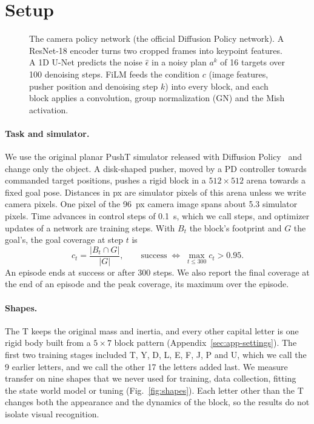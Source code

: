 \documentclass[10pt,twocolumn,letterpaper]{article}
\begin{document}
\section{Setup}
\label{sec:setup}

\begin{figure}[t]
  \centering
  
  \caption{The camera policy network (the official Diffusion Policy network). A ResNet-18 encoder turns two cropped
  frames into keypoint features. A 1D U-Net predicts the noise $\hat\epsilon$ in a noisy plan $a^k$ of 16 targets over
  100 denoising steps. FiLM feeds the condition $c$ (image features, pusher position and denoising step $k$) into every
  block, and each block applies a convolution, group normalization (GN) and the Mish activation.}
  \label{fig:cnn}
\end{figure}

\paragraph{Task and simulator.}
We use the original planar PushT simulator released with Diffusion Policy~\citep{chi2023diffusion} and change only
the object. A disk-shaped pusher, moved by a PD controller towards commanded target positions, pushes a rigid block
in a $512\times512$ arena towards a fixed goal pose. Distances in px are simulator pixels of this arena unless we write
camera pixels. One pixel of the 96~px camera image spans about 5.3 simulator pixels. Time advances in control steps of
0.1~s, which we call steps, and optimizer updates of a network are training steps. With $B_t$ the block's footprint and
$G$ the goal's, the goal coverage at step $t$ is
\begin{equation}
  c_t = \frac{|B_t \cap G|}{|G|}, \qquad \text{success} \;\Leftrightarrow\; \max_{t \le 300} c_t > 0.95 .
  \label{eq:success}
\end{equation}
An episode ends at success or after 300 steps. We also report the final coverage at the end of an episode and the
peak coverage, its maximum over the episode.

\paragraph{Shapes.}
The T keeps the original mass and inertia, and every other capital letter is one rigid body built from a $5\times7$
block pattern (Appendix~\ref{sec:app-settings}). The first two training stages included T, Y, D, L, E, F, J, P and U,
which we call the 9 earlier letters, and we call the other 17 the letters added last. We measure transfer on nine
shapes that we never used for training, data collection, fitting the state world model or tuning
(Fig.~\ref{fig:shapes}). Each letter other than the T changes both the appearance and the dynamics of the block, so
the results do not isolate visual recognition.
\end{document}
